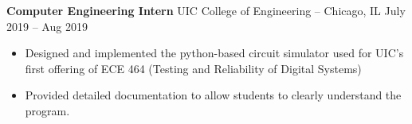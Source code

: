 \documentclass[11pt,letterpaper]{article}
\newcommand{\subheading}[3]{
    \textbf{#1}{ #2 }{\hfill #3 \vspace{-2pt}}
}
\begin{document}
\vspace{-5pt}
\subheading{Computer Engineering Intern}{UIC College of Engineering -- Chicago, IL}{ July 2019 -- Aug 2019 \\}
\vspace{-5pt}
\begin{itemize}
  \item Designed and implemented the python-based circuit simulator used for UIC's first offering of ECE 464 (Testing and Reliability of Digital Systems)
  \item Provided detailed documentation to allow students to clearly understand the program.
\end{itemize}
\vspace{-5pt}
\begin{comment}
\subheading{Engineering Student Ambassador/Mentor}{UIC College of Engineering}{July 2019 -- Aug 2019 \\}
\vspace{-5pt}
\begin{itemize}
  \item Taught review classes and workshops on Math, Physics, Chemistry, Robotics, Circuits,among others, for 18 incoming freshmen.
  \item Guided my personal mentee’s success and first year experience at the University
\end{itemize}
\vspace{-10pt}
\end{comment}
\end{document}
